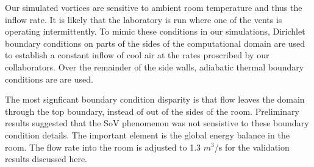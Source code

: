 Our simulated vortices are sensitive to ambient room temperature and thus 
the inflow rate. It is likely that the laboratory is run where one of
the vents is operating intermittently. 
To mimic these conditions in our simulations, Dirichlet boundary conditions 
on parts of the sides of the computational domain are used to
establish a constant inflow of cool air at the rates 
proscribed by our collaborators. Over the remainder of the side walls, 
adiabatic thermal boundary conditions are are used. 

The most signficant boundary condition disparity is that flow leaves the
domain through the top boundary, instead of out of the sides of the
room. Preliminary results suggested that the SoV phenomenon  was not
sensistive to these boundary condition details. The important element is
the  global energy balance in the room. The flow rate into the room is
adjusted to  1.3 $m^3$/s for the validation results discussed here.  




